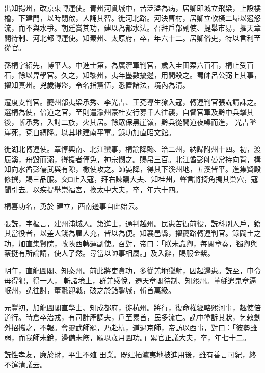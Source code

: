 \begin{pinyinscope}
 出知揚州，改京東轉運使。青州河貫城中，苦泛溢為病，居卿即城立飛梁，上設樓櫓，下建門，以時閉啟，人誦其智。徙河北路。河決曹村，居卿立軟橫二埽以遏怒流，而不與水爭。朝廷賞其功，建以為都水法。召拜戶部副使、提舉市易，擢天章閣待制、河北都轉運使。知秦州、太原府，卒，年六十二。居卿俗吏，特以言利至從官。



 孫構字紹先，博平人。中進士第，為廣濟軍判官，歲入圭田粟六百石，構止受百石，餘以畀學官。久之，知黎州，夷年墨數擾邊，用間殺之。蜀帥呂公弼上其事，擢知真州。兇歲得盜，令名指黨伍，悉置諸法，境內為清。



 遷度支判官。夔州部夷梁承秀、李光吉、王兗導生獠入寇，轉運判官張詵請誅之。選構為使，倍道之官，至則遣渝州豪杜安行募千人往襲，自督官軍及黔中兵擊其後，斬承秀，入討二族，火其居。餘眾保黑崖嶺，黔兵從間道夜噪而進，
 光吉墜崖死，兗自縛降。以其地建南平軍。錄功加直昭文館。



 徙湖北轉運使。章惇興南、北江蠻事，構諭降懿、洽二州，納歸附州十四。初，渡辰溪，舟毀而溺，得援者僅免，神宗憫之。賜帛三百。北江酋彭師晏常持向背，構知向水酋彭儒武與有隙，檄使攻之。師晏降，得其下溪州地，五溪皆平。進集賢殿修撰，賜三品服。交□止入寇，拜右諫議大夫、知桂州，聲言將掎角搗其巢穴，寇聞引去。以疾提舉崇福宮，換太中大夫，卒，年六十四。



 構喜功名，勇於
 建立，西南邊事自此始云。



 張詵，字樞言，建州浦城人。第進士，通判越州。民患苦衙前役，詵科別人戶，籍其當役者，以差人錢為雇人充，皆以為便。知襄邑縣，擢夔路轉運判官。錄闢土之功，加直集賢院，改陜西轉運副使。召對，帝曰：「朕未識卿，每閱章奏，獨卿與蔡挺有所論請，使人了然。尋當以帥事相屬。」及入辭，賜服金紫。



 明年，直龍圖閣、知秦州。前此將吏貪功，多從羌地獵射，因起邊患。詵至，申令毋得犯，得一人，
 斬諸境上，群羌感悅，遷天章閣待制、知熙州。董氈遣鬼章逼岷州，詵往討，董氈迎戰，破之於錯鑿城，斬首萬級。



 元豐初，加龍圖閣直學士、知成都府，徙杭州。將行，復命權經略熙河事，趣使倍道行。時倉卒治戎，有司計產調夫，戶至累首，民多流亡。詵中塗訴其狀，乞敕劍外招攜之，不報。會靈武師罷，乃赴杭，道過京師，帝訪以西事，對曰：「彼勢雖弱，而我師未銳，邊備未飭，願以歲月圖功。」累官正議大夫，卒，年七十二。



 詵性孝友，廉於財，平生不殖
 田業。既建拓瀘夷地被進用後，雖有善言可紀，終不逭清議云。




\end{pinyinscope}
